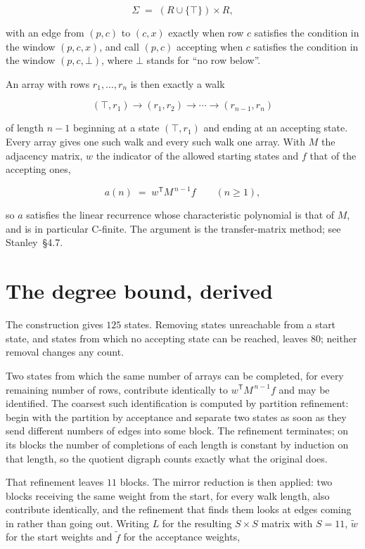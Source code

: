 \documentclass[11pt]{article}
\theoremstyle{definition}
\begin{document}
\[\Sigma \;=\; (R \cup \{\top\}) \times R,\]

with an edge from $(p,c)$ to $(c,x)$ exactly when row $c$ satisfies the condition in the window $(p,c,x)$, and call $(p,c)$ accepting when $c$ satisfies the condition in the window $(p,c,\bot)$, where $\bot$ stands for ``no row below''.

An array with rows $r_1,\dots,r_n$ is then exactly a walk

\[(\top,r_1) \to (r_1,r_2) \to \cdots \to (r_{n-1},r_n)\]

of length $n-1$ beginning at a state $(\top,r_1)$ and ending at an accepting state. Every array gives one such walk and every such walk one array. With $M$ the adjacency matrix, $w$ the indicator of the allowed starting states and $f$ that of the accepting ones,

\[a(n) \;=\; w^{\mathsf T} M^{\,n-1} f \qquad (n \ge 1),\]

so $a$ satisfies the linear recurrence whose characteristic polynomial is that of $M$, and is in particular C-finite. The argument is the transfer-matrix method; see Stanley~\S4.7.

\section{The degree bound, derived}

The construction gives $125$ states. Removing states unreachable from a start state, and states from which no accepting state can be reached, leaves $80$; neither removal changes any count.

Two states from which the same number of arrays can be completed, for every remaining number of rows, contribute identically to $w^{\mathsf T}M^{\,n-1}f$ and may be identified. The coarsest such identification is computed by partition refinement: begin with the partition by acceptance and separate two states as soon as they send different numbers of edges into some block. The refinement terminates; on its blocks the number of completions of each length is constant by induction on that length, so the quotient digraph counts exactly what the original does.

That refinement leaves $11$ blocks. The mirror reduction is then applied: two blocks receiving the same weight from the start, for every walk length, also contribute identically, and the refinement that finds them looks at edges coming in rather than going out. Writing $L$ for the resulting $S \times S$ matrix with $S = 11$, $\tilde w$ for the start weights and $\tilde f$ for the acceptance weights,
\end{document}
